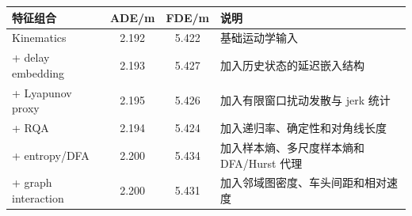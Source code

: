 \begin{tabularx}{\textwidth}{lccX}
\toprule
特征组合 & ADE/m & FDE/m & 说明 \\ 
\midrule
Kinematics & 2.192 & 5.422 & 基础运动学输入 \\ 
+ delay embedding & 2.193 & 5.427 & 加入历史状态的延迟嵌入结构 \\ 
+ Lyapunov proxy & 2.195 & 5.426 & 加入有限窗口扰动发散与 jerk 统计 \\ 
+ RQA & 2.194 & 5.424 & 加入递归率、确定性和对角线长度 \\ 
+ entropy/DFA & 2.200 & 5.434 & 加入样本熵、多尺度样本熵和 DFA/Hurst 代理 \\ 
+ graph interaction & 2.200 & 5.431 & 加入邻域图密度、车头间距和相对速度 \\ 
\bottomrule
\end{tabularx}
